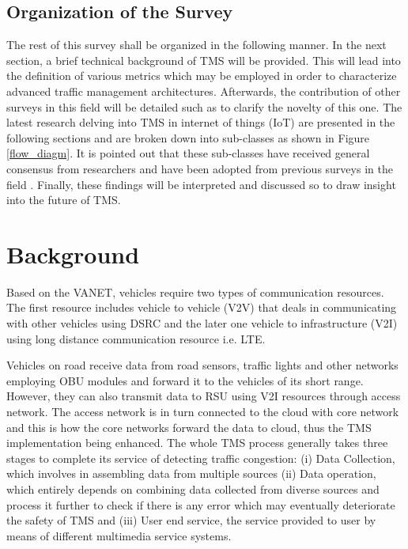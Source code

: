 \documentclass[conference]{IEEEtran}
\begin{document}
\subsection{Organization of the Survey}
The rest of this survey shall be organized in the following manner. In the next section, a brief technical background of TMS will be provided. This will lead into the definition of various metrics which may be employed in order to characterize advanced traffic management architectures. Afterwards, the contribution of other surveys in this field will be detailed such as to clarify the novelty of this one. The latest research delving into TMS in internet of things (IoT) are presented in the following sections and are broken down into sub-classes as shown in Figure \ref{flow_diagm}. It is pointed out that these sub-classes have received general consensus from researchers and have been adopted from previous surveys in the field \cite{Botnet:Hoque,Zargar:DDOSFlood}. Finally, these findings will be interpreted and discussed so to draw insight into the future of TMS.

\section{Background}

Based on the VANET, vehicles require two types of communication resources. The first resource includes vehicle to vehicle (V2V) that deals in communicating with other vehicles using DSRC and the later one vehicle to infrastructure (V2I) using long distance communication resource i.e.  LTE. 

Vehicles on road receive data from road sensors, traffic lights and other networks employing OBU modules and forward it to the vehicles of its short range. However, they can also transmit data to RSU using V2I resources through access network. The access network is in turn connected to the cloud with core network and this is how the core networks forward the data to cloud, thus the TMS implementation being enhanced. The whole TMS process generally takes three stages to complete its service of detecting traffic congestion: (i) Data Collection, which involves in assembling data from multiple sources (ii) Data operation, which entirely depends on combining data collected from diverse sources and process it further to check if there is any error which may eventually deteriorate the safety of TMS and (iii) User end service, the service provided to user by means of different multimedia service systems.
\end{document}
